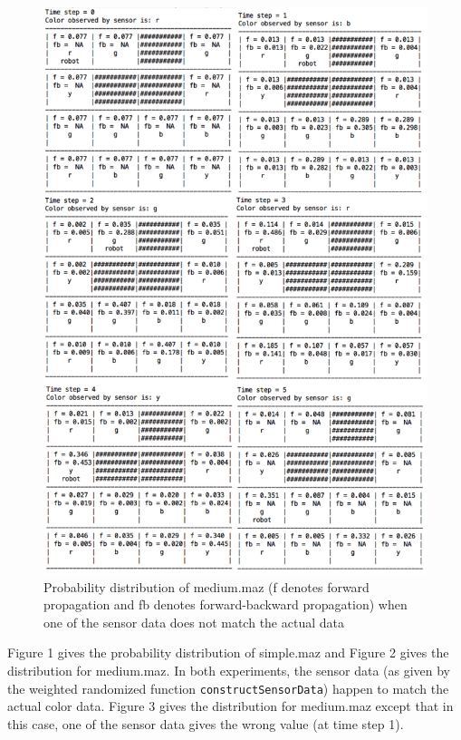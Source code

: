 \documentclass[9.5pt]{extarticle}
\begin{document}
\begin{figure}[H]
\centering
\includegraphics[scale=0.78]{mediumresult.png}
\caption{Probability distribution of medium.maz (f denotes forward propagation and fb denotes forward-backward propagation) when one of the sensor data does not match the actual data}
\label{Figure 3}
\end{figure}

Figure 1 gives the probability distribution of simple.maz and Figure 2 gives the distribution for medium.maz. In both experiments, the sensor data (as given by the weighted randomized function \verb`constructSensorData`) happen to match the actual color data. Figure 3 gives the distribution for medium.maz except that in this case, one of the sensor data gives the wrong value (at time step 1).\\
\end{document}
